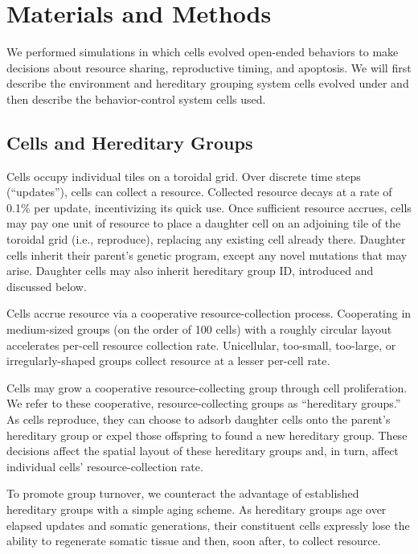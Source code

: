 \section{Materials and Methods}



We performed simulations in which cells evolved open-ended behaviors to make decisions about resource sharing, reproductive timing, and apoptosis.
We will first describe the environment and hereditary grouping system cells evolved under and then describe the behavior-control system cells used.

\subsection{Cells and Hereditary Groups}

Cells occupy individual tiles on a toroidal grid.
Over discrete time steps (``updates''), cells can collect a resource.
Collected resource decays at a rate of 0.1\% per update, incentivizing its quick use.
Once sufficient resource accrues, cells may pay one unit of resource to place a daughter cell on an adjoining tile of the toroidal grid (i.e., reproduce), replacing any existing cell already there.
Daughter cells inherit their parent's genetic program, except any novel mutations that may arise.
Daughter cells may also inherit hereditary group ID, introduced and discussed below.

Cells accrue resource via a cooperative resource-collection process.
Cooperating in medium-sized groups (on the order of 100 cells) with a roughly circular layout accelerates per-cell resource collection rate.
Unicellular, too-small, too-large, or irregularly-shaped groups collect resource at a lesser per-cell rate.

Cells may grow a cooperative resource-collecting group through cell proliferation.
We refer to these cooperative, resource-collecting groups as ``hereditary groups.''
As cells reproduce, they can choose to adsorb daughter cells onto the parent's hereditary group or expel those offspring to found a new hereditary group.
These decisions affect the spatial layout of these hereditary groups and, in turn, affect individual cells' resource-collection rate.

To promote group turnover, we counteract the advantage of established hereditary groups with a simple aging scheme.
As hereditary groups age over elapsed updates and somatic generations, their constituent cells expressly lose the ability to regenerate somatic tissue and then, soon after, to collect resource.


